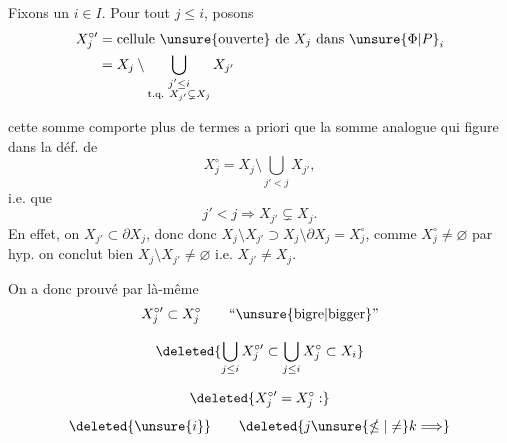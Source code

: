 
Fixons un $i\in I$. Pour tout $j\leq i$, posons
\[
\begin{aligned}
X_j^{\circ\prime}&=\text{cellule \unsure{ouverte} de }X_j\text{ dans }\unsure{\Phi|P}_i\\
&=X_j\setminus\bigcup_{\substack{j'\leq i\\\text{t.q. }X_{j'}\subsetneq X_j}}X_{j'}
\end{aligned}
\]

 cette somme comporte plus de termes a priori que la somme analogue qui figure dans la déf. de
\[
X_j^\circ=X_j\setminus\bigcup_{j'<j}X_{j'},
\]
i.e. que
\[
j'<j\Longrightarrow X_{j'}\subsetneq X_j.
\]
En effet, on    $X_{j'}\subset\partial X_j$, donc  donc $X_j\setminus X_{j'}\supset X_j\setminus\partial X_j=X_j^\circ$, comme $X_j^\circ\ne\varnothing$ par hyp. on conclut  bien $X_j\setminus X_{j'}\ne\varnothing$ i.e. $X_{j'}\ne X_j$.

On a donc prouvé par là-même
\[
X_j^{\circ\prime}\subset X_j^\circ\qquad\text{``\unsure{bigre|bigger}''}
\]

   
\[
\deleted{\bigcup_{j\leq i}X_j^{\circ\prime}\subset\bigcup_{j\leq i}X_j^\circ\subset X_i}
\]

\[
\deleted{X_j^{\circ\prime}=X_j^\circ:}
\]
   
\[
\deleted{\unsure{i}}\qquad\deleted{j\unsure{\nleq|\ne}k\Longrightarrow}
\]

